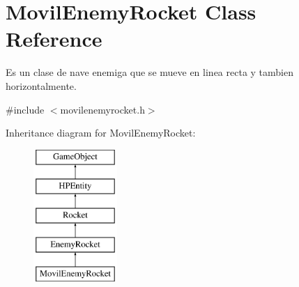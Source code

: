 \hypertarget{class_movil_enemy_rocket}{\section{Movil\-Enemy\-Rocket Class Reference}
\label{class_movil_enemy_rocket}
}


Es un clase de nave enemiga que se mueve en linea recta y tambien horizontalmente.  




{\ttfamily \#include $<$movilenemyrocket.\-h$>$}

Inheritance diagram for Movil\-Enemy\-Rocket\-:\begin{figure}[H]
\begin{center}
\leavevmode
\includegraphics[height=5.000000cm]{class_movil_enemy_rocket}
\end{center}
\end{figure}

